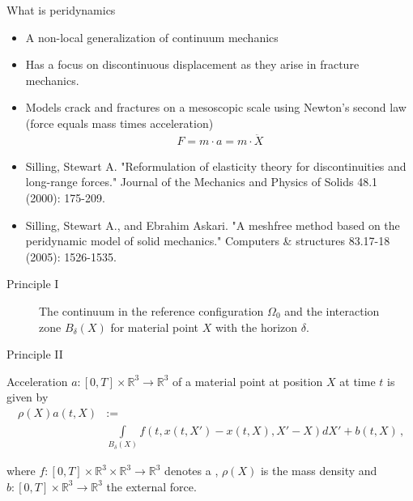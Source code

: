 \documentclass[12pt,t]{beamer}
\newcommand{\R}{\mathbb{R}}
\newcommand{\ftime}{[0,T]}
\begin{document}
\begin{frame}{What is peridynamics}

\begin{itemize}
\item A non-local generalization of continuum mechanics 
\item Has a focus on discontinuous displacement as they arise in fracture mechanics.
\item Models crack and fractures on a mesoscopic scale using Newton's second law (force equals mass times acceleration)
\begin{align*}
F = m \cdot a = m \cdot \ddot X
\end{align*}
\end{itemize}
\small
\begin{itemize}
\item Silling, Stewart A. "Reformulation of elasticity theory for discontinuities and long-range forces." Journal of the Mechanics and Physics of Solids 48.1 (2000): 175-209.
\item Silling, Stewart A., and Ebrahim Askari. "A meshfree method based on the peridynamic model of solid mechanics." Computers \& structures 83.17-18 (2005): 1526-1535.
\end{itemize}
\end{frame}

\begin{frame}{Principle I}
\begin{figure}[!htbp]
\caption{The continuum in the reference configuration $\Omega_0$ and the interaction zone $B_\delta(X)$ for material point $X$ with the horizon $\delta$.}
\label{fig::chapter2:02}
\end{figure}

\end{frame}

\begin{frame}{Principle II}

\begin{block}{Acceleration $a:\ftime\times\R^3\rightarrow\R^3$}
of a material point at position $X$ at time $t$ is given by
\begin{align*}
\rho(X)a(t,X)&:= \\
&\int\limits_{B_\delta(X)} f\left(t,x(t,X')-x(t,X), X'-X\right)dX' + b(t,X)\,\text{,}
\label{eq::chapter2:01}
\end{align*}
\end{block}
where $f:[0,T]\times\R^3\times\R^3\rightarrow\R^3$ denotes a , $\rho(X)$ is the mass density and $b:[0,T]\times\mathbb{R}^3\rightarrow\mathbb{R}^3$ the external force. 
\end{frame}
\end{document}
